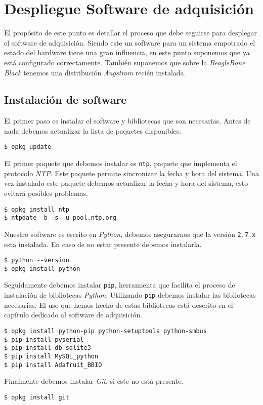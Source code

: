 \appendix

\chapter{Despliegue Software de adquisición}
	\label{app_soft}
	El propósito de este punto es detallar el proceso que debe seguirse para desplegar el software de adquisición. Siendo este un software para un
	sistema empotrado el estado del hardware tiene una gran influencia, en este punto suponemos que ya está configurado correctamente. También
	suponemos que sobre la \emph{BeagleBone Black} tenemos una distribución \emph{Angstrom} recién instalada.
	\section{Instalación de software} 
		El primer paso es instalar el software y bibliotecas que son necesarias. Antes de nada debemos actualizar la lista de paquetes
		disponibles. 
		\begin{lstlisting}[style=myBash]
$ opkg update
		\end{lstlisting}
		\par
		El primer paquete que debemos instalar es \texttt{ntp}, paquete que implementa el protocolo \emph{NTP}. Este paquete permite
		sincronizar la fecha y hora del sistema.  Una vez instalado este paquete debemos actualizar la fecha y hora del sistema, esto evitará
		posibles problemas.
		\begin{lstlisting}[style=myBash]
$ opkg install ntp
$ ntpdate -b -s -u pool.ntp.org
		\end{lstlisting}
		\par
		Nuestro software es escrito en \emph{Python}, debemos asegurarnos que la versión \texttt{2.7.x} esta instalada. En caso de no estar
		presente debemos instalarla.
		\begin{lstlisting}[style=myBash]
$ python --version
$ opkg install python
		\end{lstlisting}
		Seguidamente debemos instalar \texttt{pip}, herramienta que facilita el proceso de instalación de bibliotecas \emph{Python}.
		Utilizando \texttt{pip} debemos instalar las bibliotecas necesarias. El uso que hemos hecho de estas bibliotecas está descrito en el
		capítulo dedicado al software de adquisición.
		\begin{lstlisting}[style=myBash]
$ opkg install python-pip python-setuptools python-smbus
$ pip install pyserial
$ pip install db-sqlite3
$ pip install MySQL_python
$ pip install Adafruit_BBIO
		\end{lstlisting}
		\par
		Finalmente debemos instalar \emph{Git}, si este no está presente.
		\begin{lstlisting}[style=myBash]
$ opkg install git
		\end{lstlisting}
